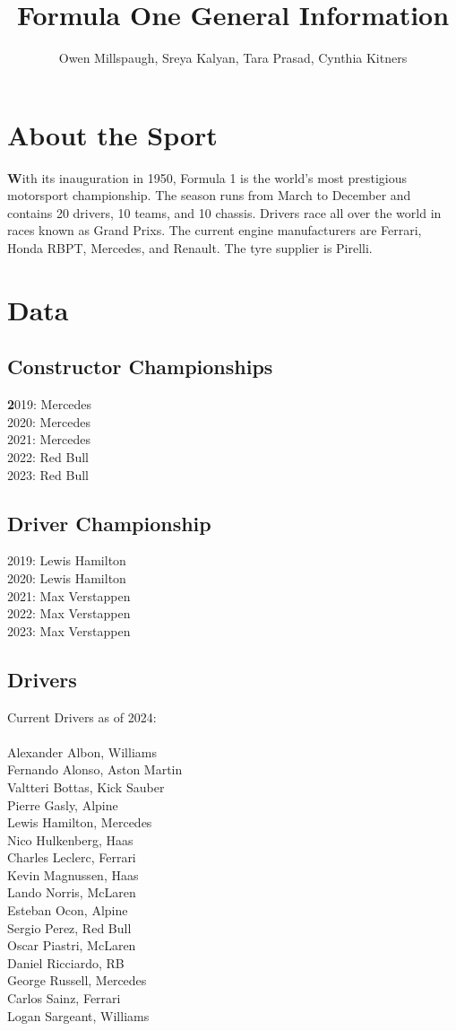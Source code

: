 \documentclass[12pt]{article}
\title{Formula One General Information}
\author{Owen Millspaugh, Sreya Kalyan, Tara Prasad, Cynthia Kitners}
\begin{document}
\maketitle

\section{About the Sport}
\textbf With its inauguration in 1950, Formula 1 is the world's most prestigious motorsport championship. 
The season runs from March to December and contains 20 drivers, 10 teams, and 10 chassis.
Drivers race all over the world in races known as Grand Prixs.
The current engine manufacturers are Ferrari, Honda RBPT, Mercedes, and Renault. 
The tyre supplier is Pirelli.
\section{Data}
\subsection{Constructor Championships}
\textbf 2019: Mercedes\\
2020: Mercedes\\
2021: Mercedes\\
2022: Red Bull\\
2023: Red Bull
\subsection{Driver Championship}
2019: Lewis Hamilton\\
2020: Lewis Hamilton\\
2021: Max Verstappen\\
2022: Max Verstappen\\
2023: Max Verstappen
\subsection{Drivers}
Current Drivers as of 2024:\\
\\
Alexander Albon, Williams\\
Fernando Alonso, Aston Martin\\
Valtteri Bottas, Kick Sauber\\
Pierre Gasly, Alpine\\
Lewis Hamilton, Mercedes\\
Nico Hulkenberg, Haas\\
Charles Leclerc, Ferrari\\
Kevin Magnussen, Haas\\
Lando Norris, McLaren\\
Esteban Ocon, Alpine\\
Sergio Perez, Red Bull\\
Oscar Piastri, McLaren\\
Daniel Ricciardo, RB\\
George Russell, Mercedes\\
Carlos Sainz, Ferrari\\
Logan Sargeant, Williams\\
\end{document}
